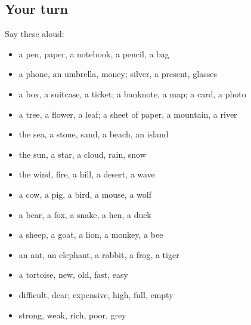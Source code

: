 \subsection*{Your turn}
Say these aloud:

\begin{itemize}
\raggedright
  \item a pen, paper, a notebook, a pencil, a bag
  \item a phone, an umbrella, money; silver, a present, glasses
  \item a box, a suitcase, a ticket; a banknote, a map; a card, a photo
  \item a tree, a flower, a leaf; a sheet of paper, a mountain, a river
  \item the sea, a stone, sand, a beach, an island
  \item the sun, a star, a cloud, rain, snow
  \item the wind, fire, a hill, a desert, a wave
  \item a cow, a pig, a bird, a mouse, a wolf
  \item a bear, a fox, a snake, a hen, a duck
  \item a sheep, a goat, a lion, a monkey, a bee
  \item an ant, an elephant, a rabbit, a frog, a tiger
  \item a tortoise, new, old, fast, easy
  \item difficult, dear; expensive, high, full, empty
  \item strong, weak, rich, poor, grey
\end{itemize}

